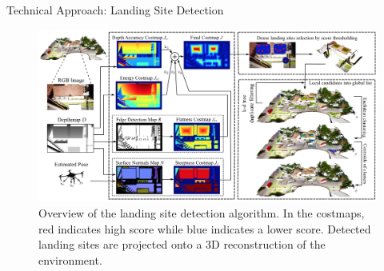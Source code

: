 \documentclass[10pt]{beamer}
\begin{document}

    \begin{frame}{Technical Approach: Landing Site Detection}
        \begin{figure}
            \caption{
                \justifying
                Overview of the landing site detection algorithm. In
                the costmaps, red indicates high score while blue indicates
                a lower score. Detected landing sites are projected onto
                a 3D reconstruction of the environment.}
            \vspace{-0.3cm}
            \includegraphics[width=\textwidth]{images/Fig3.png}
        \end{figure}
    \end{frame}
\end{document}
